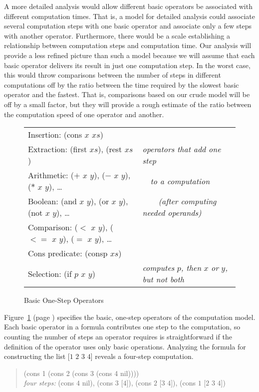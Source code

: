 A more detailed analysis would allow different
basic operators be associated with different computation times.
That is, a model for detailed analysis could associate
several computation steps with one basic operator
and associate only a few steps with another operator.
Furthermore, there
would be a scale establishing a relationship between
computation steps and computation time.
Our analysis will provide a less refined picture than such
a model because we will assume that each basic operator
delivers its result in just one computation step.
In the worst case, this would throw comparisons between
the number of steps in different computations off
by the ratio between the time required by the slowest basic
operator and the fastest. That is, comparisons
based on our crude model
will be off by a small factor,
but they will provide a
rough estimate of the ratio between the computation speed of
one operator and another.

\begin{figure}
\begin{center}
\begin{tabular}{ll}
Insertion: (cons $x$ $xs$)                                       & \\
Extraction: (first $xs$), (rest $xs$)                            & \emph{operators that add one step}           \\
Arithmetic: ($+$ $x$ $y$), ($-$ $x$ $y$), ($*$ $x$ $y$), \dots   & ~~\emph{to a computation}                    \\
Boolean: (and $x$ $y$), (or $x$ $y$), (not $x$ $y$), \dots       & ~~~~\emph{(after computing needed operands)} \\
Comparison: ($<$ $x$ $y$), ($<=$ $x$ $y$), ($=$ $x$ $y$), \dots  & \\
Cons predicate: (consp $xs$)                                     & \\
Selection: (if $p$ $x$ $y$)                                      & \emph{computes} $p$\emph{, then} $x$ \emph{or} $y$\emph{, but not both}
\end{tabular}
\end{center}
\caption{Basic One-Step Operators}
\label{fig:basic-one-step-ops}
\end{figure}

Figure~\ref{fig:basic-one-step-ops} (page \pageref{fig:basic-one-step-ops})
specifies the basic, one-step operators of
the computation model.
Each basic operator in a formula contributes one step
to the computation, so
counting the number of steps an operator
requires is straightforward
if the definition of the operator uses only basic operations.
Analyzing the formula for constructing
the list [$1$ $2$ $3$ $4$] reveals a four-step computation.
\begin{quote}
(cons 1 (cons 2 (cons 3 (cons 4 nil))))\\
\emph{four steps: }(cons $4$ nil), (cons $3$ [$4$]), (cons $2$ [$3$ $4$]), (cons $1$ [$2$ $3$ $4$])
\end{quote}

